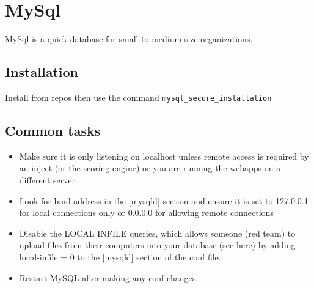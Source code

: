 \section{MySql}

MySql is a quick database for small to medium size organizations.

\subsection{Installation}

Install from repos then use the command \lstinline|mysql_secure_installation|

\subsection{Common tasks}


\begin{itemize}
	\item Make sure it is only listening on localhost unless remote access is required by an inject (or the scoring engine) or you are running the webapps on a different server.
	\item Look for bind-address in the [mysqld] section and ensure it is set to 127.0.0.1 for local connections only or 0.0.0.0 for allowing remote connections
	\item Disable the LOCAL INFILE queries, which allows someone (red team) to upload files from their computers into your database (see here) by adding local-infile = 0 to the [mysqld] section of the conf file.
	\item Restart MySQL after making any conf changes.
\end{itemize}
